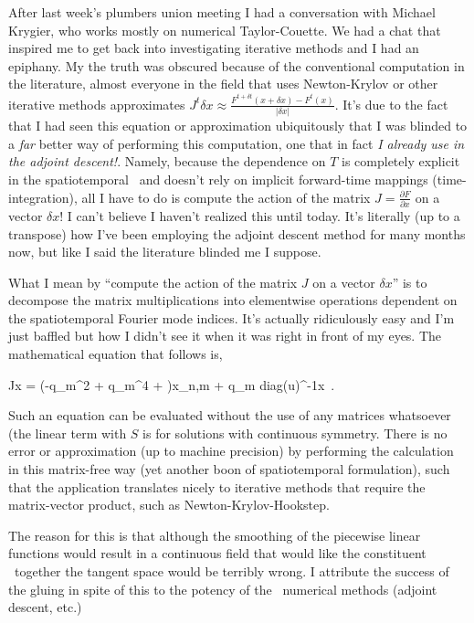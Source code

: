 After last week's plumbers union meeting I had a conversation with Michael Krygier, who works mostly
on numerical Taylor-Couette. We had a chat that inspired me to get back into investigating iterative methods
and I had an epiphany. My the truth was obscured because of the conventional computation in the literature, almost
everyone in the field that uses Newton-Krylov or other iterative methods
approximates $J^t \delta x \approx \frac{F^{t+\delta t}(x+\delta x)-F^t(x)}{|\delta x|}$. It's due to the fact that I
had seen this equation or approximation ubiquitously that I was blinded to a \emph{far} better way of performing
this computation, one that in fact \emph{I already use in the adjoint descent!}.
Namely, because the dependence on
$T$ is completely explicit in the spatiotemporal \KSe\ and doesn't rely on
implicit forward-time mappings (\ie time-integration),
all I have to do is compute the action of the matrix
$J = \frac{\partial F}{\partial x}$ on a vector $\delta x$! I can't believe
I haven't realized this until today. It's literally (up to a transpose)
how I've been employing the adjoint descent method
for many months now, but like I said the literature blinded
me I suppose.

What I mean by ``compute the action of the matrix $J$ on a vector $\delta x$''
is to decompose the matrix multiplications
into elementwise operations dependent on the spatiotemporal
Fourier mode indices. It's actually ridiculously easy and I'm just baffled
but how I didn't see it when it was right in front of my eyes.
The mathematical equation that follows is,

\beq
J\cdot x = (\ii \omegaj -q_m^2 + q_m^4 + )x_{n,m} + \ii q_m diag(u)^{-1}x \,.
\eeq

Such an equation can be evaluated without the use of any matrices whatsoever (the linear term with $S$ is for solutions with continuous
symmetry. There is no error or approximation (up to machine precision)
by performing the calculation in this matrix-free way (yet another boon of spatiotemporal formulation), such that the application
translates nicely to iterative methods that require the matrix-vector product, such as Newton-Krylov-Hookstep.




The reason for this is that although the smoothing
of the piecewise linear functions would result in
a continuous field that would like the constituent
\twots\ together the tangent space would be terribly
wrong. I attribute the success of the gluing in spite
of this to the potency of the \spt\ numerical methods (adjoint
descent, etc.)

